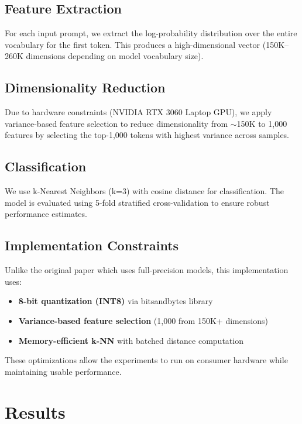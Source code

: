 \documentclass[11pt]{article}
\begin{document}
\subsection{Feature Extraction}

For each input prompt, we extract the log-probability distribution over the entire vocabulary for the first token. This produces a high-dimensional vector (150K--260K dimensions depending on model vocabulary size).

\subsection{Dimensionality Reduction}

Due to hardware constraints (NVIDIA RTX 3060 Laptop GPU), we apply variance-based feature selection to reduce dimensionality from $\sim$150K to 1,000 features by selecting the top-1,000 tokens with highest variance across samples.

\subsection{Classification}

We use k-Nearest Neighbors (k=3) with cosine distance for classification. The model is evaluated using 5-fold stratified cross-validation to ensure robust performance estimates.

\subsection{Implementation Constraints}

Unlike the original paper which uses full-precision models, this implementation uses:
\begin{itemize}
    \item \textbf{8-bit quantization (INT8)} via bitsandbytes library
    \item \textbf{Variance-based feature selection} (1,000 from 150K+ dimensions)
    \item \textbf{Memory-efficient k-NN} with batched distance computation
\end{itemize}

These optimizations allow the experiments to run on consumer hardware while maintaining usable performance.

\section{Results}
\end{document}
